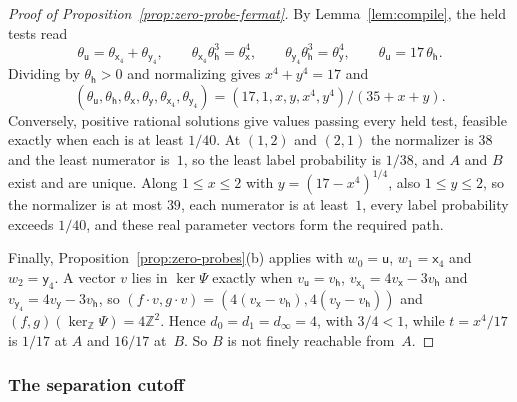 \begin{proof}[Proof of Proposition~\ref{prop:zero-probe-fermat}]
By Lemma~\ref{lem:compile}, the held tests read
\[
  \theta_{\mathsf u}=\theta_{\mathsf x_4}+\theta_{\mathsf y_4},\qquad
  \theta_{\mathsf x_4}\theta_{\mathsf h}^3=\theta_{\mathsf x}^4,\qquad
  \theta_{\mathsf y_4}\theta_{\mathsf h}^3=\theta_{\mathsf y}^4,\qquad
  \theta_{\mathsf u}=17\,\theta_{\mathsf h}.
\]
Dividing by $\theta_{\mathsf h}>0$ and normalizing gives $x^4+y^4=17$ and
\[
  (\theta_{\mathsf u},\theta_{\mathsf h},\theta_{\mathsf x},\theta_{\mathsf
  y},\theta_{\mathsf x_4},\theta_{\mathsf y_4})=(17,1,x,y,x^4,y^4)/(35+x+y).
\]
Conversely, positive rational solutions give values passing every held
test, feasible exactly when each is at least $1/40$.
At $(1,2)$ and $(2,1)$ the normalizer is $38$ and the least numerator
is~$1$, so the least label probability is $1/38$, and $A$ and $B$ exist
and are unique. Along $1\le x\le2$ with $y=(17-x^4)^{1/4}$, also
$1\le y\le2$, so the normalizer is at most $39$, each numerator is at
least~$1$, every label probability exceeds $1/40$, and these real
parameter vectors form the required path.

Finally, Proposition~\ref{prop:zero-probes}(b) applies with
$w_0=\mathsf u$, $w_1=\mathsf x_4$ and $w_2=\mathsf y_4$. A vector $v$
lies in $\ker\Psi$ exactly when $v_{\mathsf u}=v_{\mathsf h}$,
$v_{\mathsf x_4}=4v_{\mathsf x}-3v_{\mathsf h}$ and $v_{\mathsf
y_4}=4v_{\mathsf y}-3v_{\mathsf h}$, so $(f\cdot v,g\cdot v)=(4(v_{\mathsf
x}-v_{\mathsf h}),4(v_{\mathsf y}-v_{\mathsf h}))$ and
$(f,g)(\ker_{\mathbb Z}\Psi)=4\mathbb Z^2$. Hence $d_0=d_1=d_\infty=4$,
with $3/4<1$, while $t=x^4/17$ is $1/17$ at $A$ and $16/17$ at~$B$. So $B$
is not finely reachable from~$A$.
\end{proof}

\subsubsection{The separation cutoff}\label{app:separation}

